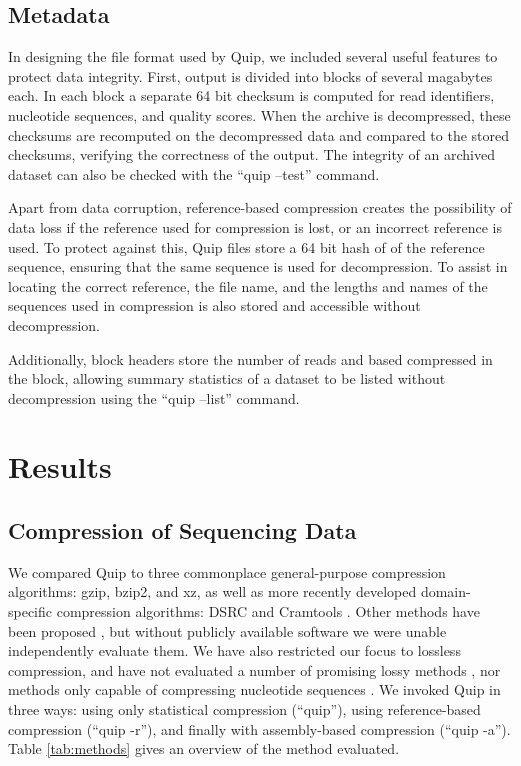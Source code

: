 \documentclass[a4,center,fleqn]{NAR}
\begin{document}
\subsection{Metadata}

In designing the file format used by Quip, we included several useful features
to protect data integrity. First, output is divided into blocks of several
magabytes each. In each block a separate 64 bit checksum is computed for read
identifiers, nucleotide sequences, and quality scores. When the archive is
decompressed, these checksums are recomputed on the decompressed data and
compared to the stored checksums, verifying the correctness of the output. The
integrity of an archived dataset can also be checked with the ``quip --test''
command.

Apart from data corruption, reference-based compression creates the
possibility of data loss if the reference used for compression is lost, or an
incorrect reference is used. To protect against this, Quip files store a 64
bit hash of of the reference sequence, ensuring that the same sequence is used
for decompression. To assist in locating the correct reference, the file name,
and the lengths and names of the sequences used in compression is also stored
and accessible without decompression.

Additionally, block headers store the number of reads and based compressed in
the block, allowing summary statistics of a dataset to be listed without
decompression using the ``quip --list'' command.


\section{Results}
\label{section:results}

\subsection{Compression of Sequencing Data}


We compared Quip to three commonplace general-purpose compression algorithms:
gzip, bzip2, and xz, as well as more recently developed domain-specific
compression algorithms: DSRC \citep{Deorowicz2011} and Cramtools
\citep{Hsi-YangFritz2011}. Other methods have been proposed \citep{Tembe2010,
Kozanitis2011, Bhola2011}, but without publicly available software we were
unable independently evaluate them. We have also restricted our focus to
lossless compression, and have not evaluated a number of promising lossy
methods \citep{Hsi-YangFritz2011,Wan2011,Hach2012}, nor methods only capable
of compressing nucleotide sequences \citep{Cox2012}. We invoked Quip in three
ways: using only statistical compression (``quip''), using reference-based
compression (``quip -r''), and finally with assembly-based compression (``quip
-a''). Table \ref{tab:methods} gives an overview of the method evaluated.
\end{document}
